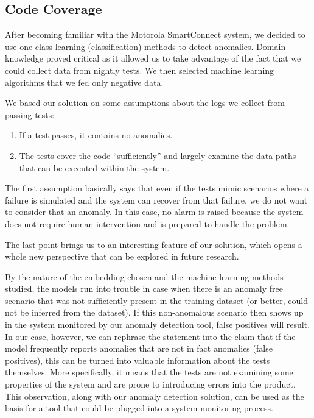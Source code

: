 \subsection{Code Coverage}
\label{code_coverage}
After becoming familiar with the Motorola SmartConnect system, we decided to use one-class learning (classification) methods to detect anomalies.
Domain knowledge proved critical as it allowed us to take advantage of the fact that we could collect data from nightly tests. 
We then selected machine learning algorithms that we fed only negative data.

We based our solution on some assumptions about the logs we collect from passing tests:
\begin{enumerate}

    \item If a test passes, it contains no anomalies.
    \item The tests cover the code “sufficiently” and largely examine the data paths that can be executed within the system. 

\end{enumerate}

The first assumption basically says that even if the tests mimic scenarios where a failure is simulated and the system can recover from that failure, we do not want to consider that an anomaly. 
In this case, no alarm is raised because the system does not require human intervention and is prepared to handle the problem.

The last point brings us to an interesting feature of our solution, which opens a whole new perspective that can be explored in future research.

By the nature of the embedding chosen and the machine learning methods studied, the models run into trouble in case when there is an anomaly free scenario that was not sufficiently present in the training dataset (or better, could not be inferred from the dataset). If this non-anomalous scenario then shows up in the system monitored by our anomaly detection tool, false positives will result.\\
In our case, however, we can rephrase the statement into the claim that if the model frequently reports anomalies that are not in fact anomalies (false positives), this can be turned into valuable information about the tests themselves. 
More specifically, it means that the tests are not examining some properties of the system and are prone to introducing errors into the product. 
This observation, along with our anomaly detection solution, can be used as the basis for a tool that could be plugged into a system monitoring process.

